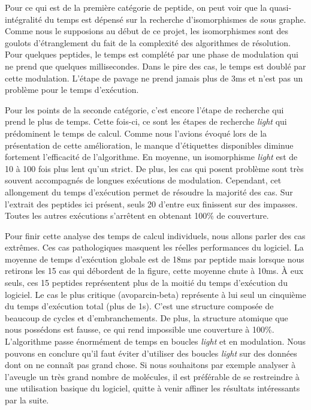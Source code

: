 Pour ce qui est de la première catégorie de peptide, on peut voir que la quasi-intégralité du temps est dépensé sur la recherche d'isomorphismes de sous graphe.
Comme nous le supposions au début de ce projet, les isomorphismes sont des goulots d'étranglement du fait de la complexité des algorithmes de résolution.
Pour quelques peptides, le temps est complété par une phase de modulation qui ne prend que quelques millisecondes.
Dans le pire des cas, le temps est doublé par cette modulation.
L'étape de pavage ne prend jamais plus de 3ms et n'est pas un problème pour le temps d'exécution.

Pour les points de la seconde catégorie, c'est encore l'étape de recherche qui prend le plus de temps.
Cette fois-ci, ce sont les étapes de recherche \textit{light} qui prédominent le temps de calcul.
Comme nous l'avions évoqué lors de la présentation de cette amélioration, le manque d'étiquettes disponibles diminue fortement l'efficacité de l'algorithme.
En moyenne, un isomorphisme \textit{light} est de 10 à 100 fois plus lent qu'un strict.
De plus, les cas qui posent problème sont très souvent accompagnés de longues exécutions de modulation.
Cependant, cet allongement du temps d'exécution permet de résoudre la majorité des cas.
Sur l'extrait des peptides ici présent, seuls 20 d'entre eux finissent sur des impasses.
Toutes les autres exécutions s'arrêtent en obtenant 100\% de couverture.

Pour finir cette analyse des temps de calcul individuels, nous allons parler des cas extrêmes.
Ces cas pathologiques masquent les réelles performances du logiciel.
La moyenne de temps d'exécution globale est de 18ms par peptide mais lorsque nous retirons les 15 cas qui débordent de la figure, cette moyenne chute à 10ms.
À eux seuls, ces 15 peptides représentent plus de la moitié du temps d'exécution du logiciel.
Le cas le plus critique (avoparcin-beta) représente à lui seul un cinquième du temps d'exécution total (plus de 1s).
C'est une structure composée de beaucoup de cycles et d'embranchements. De plus, la structure atomique que nous possédons est fausse, ce qui rend impossible une couverture à 100\%.
L'algorithme passe énormément de temps en boucles \textit{light} et en modulation.
Nous pouvons en conclure qu'il faut éviter d'utiliser des boucles \textit{light} sur des données dont on ne connaît pas grand chose.
Si nous souhaitons par exemple analyser à l'aveugle un très grand nombre de molécules, il est préférable de se restreindre à une utilisation basique du logiciel, quitte à venir affiner les résultats intéressants par la suite.








